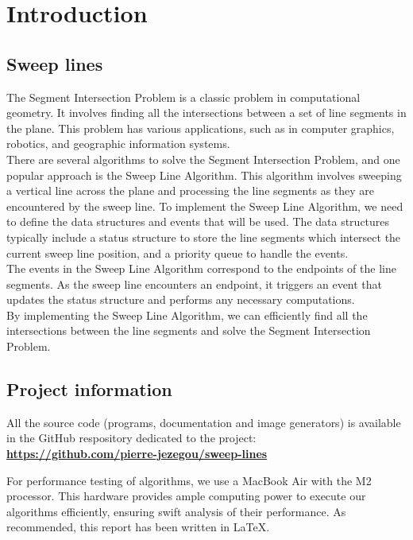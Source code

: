 \documentclass[10pt,a4paper,hidelinks]{article}
\begin{document}

\tableofcontents

\section{Introduction}
\subsection{Sweep lines}
The Segment Intersection Problem is a classic problem in computational geometry. It involves finding all the intersections between a set of line segments in the plane. This problem has various applications, such as in computer graphics, robotics, and geographic information systems.\\

There are several algorithms to solve the Segment Intersection Problem, and one popular approach is the Sweep Line Algorithm. This algorithm involves sweeping a vertical line across the plane and processing the line segments as they are encountered by the sweep line.
To implement the Sweep Line Algorithm, we need to define the data structures and events that will be used. The data structures typically include a status structure to store the line segments which intersect the current sweep line position, and a priority queue to handle the events.\\
The events in the Sweep Line Algorithm correspond to the endpoints of the line segments. As the sweep line encounters an endpoint, it triggers an event that updates the status structure and performs any necessary computations.\\

By implementing the Sweep Line Algorithm, we can efficiently find all the intersections between the line segments and solve the Segment Intersection Problem.


\subsection{Project information}
All the source code (programs, documentation and image generators) is available in the GitHub respository dedicated to the project: \textbf{\url{https://github.com/pierre-jezegou/sweep-lines}}

For performance testing of algorithms, we use a MacBook Air with the M2 processor. This hardware provides ample computing power to execute our algorithms efficiently, ensuring swift analysis of their performance. As recommended, this report has been written in \LaTeX.
\end{document}
